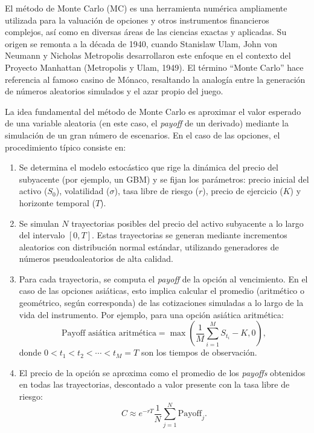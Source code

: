 \documentclass[11pt,a4paper,spanish]{article}
\numberwithin{equation}{section} %
\begin{document}
El método de Monte Carlo (MC) es una herramienta numérica ampliamente utilizada para la valuación de opciones y otros instrumentos financieros complejos, así como en diversas áreas de las ciencias exactas y aplicadas. Su origen se remonta a la década de 1940, cuando Stanislaw Ulam, John von Neumann y Nicholas Metropolis desarrollaron este enfoque en el contexto del Proyecto Manhattan (Metropolis y Ulam, 1949). El término “Monte Carlo” hace referencia al famoso casino de Mónaco, resaltando la analogía entre la generación de números aleatorios simulados y el azar propio del juego.

La idea fundamental del método de Monte Carlo es aproximar el valor esperado de una variable aleatoria (en este caso, el \textit{payoff} de un derivado) mediante la simulación de un gran número de escenarios. En el caso de las opciones, el procedimiento típico consiste en:

\begin{enumerate}
    \item Se determina el modelo estocástico que rige la dinámica del precio del subyacente (por ejemplo, un GBM) y se fijan los parámetros: precio inicial del activo ($S_0$), volatilidad ($\sigma$), tasa libre de riesgo ($r$), precio de ejercicio ($K$) y horizonte temporal ($T$).

    \item Se simulan $N$ trayectorias posibles del precio del activo subyacente a lo largo del intervalo $[0,T]$. Estas trayectorias se generan mediante incrementos aleatorios con distribución normal estándar, utilizando generadores de números pseudoaleatorios de alta calidad.

    \item Para cada trayectoria, se computa el \textit{payoff} de la opción al vencimiento. En el caso de las opciones asiáticas, esto implica calcular el promedio (aritmético o geométrico, según corresponda) de las cotizaciones simuladas a lo largo de la vida del instrumento. Por ejemplo, para una opción asiática aritmética:
    \begin{equation}
    \text{Payoff asiática aritmética} = \max\left( \frac{1}{M}\sum_{i=1}^{M} S_{t_i} - K, 0 \right),
    \end{equation}
    donde $0 < t_1 < t_2 < \cdots < t_M = T$ son los tiempos de observación.

    \item El precio de la opción se aproxima como el promedio de los \textit{payoffs} obtenidos en todas las trayectorias, descontado a valor presente con la tasa libre de riesgo:
    \begin{equation}
    C \approx e^{-rT}\frac{1}{N}\sum_{j=1}^{N}\text{Payoff}_j.
    \end{equation}
\end{enumerate}
\end{document}
